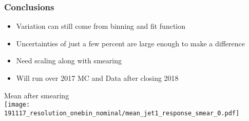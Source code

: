 \documentclass{beamer}
\newcommand{\beginbackup}{
  \newcounter{framenumbervorappendix}
  \setcounter{framenumbervorappendix}{\value{framenumber}}
}
\newcommand{\backupend}{
  \addtocounter{framenumbervorappendix}{-\value{framenumber}}
  \addtocounter{framenumber}{\value{framenumbervorappendix}}
}
\begin{document}
\begin{frame}
  \frametitle{Conclusions}

  \begin{itemize}
  \item Variation can still come from binning and fit function
  \item Uncertainties of just a few percent are large enough to make a difference
  \item Need scaling along with smearing
  \item Will run over 2017 MC and Data after closing 2018
  \end{itemize}

  \vfill

  \centering
  Mean after smearing \\
  \texttt{[image: 191117\_resolution\_onebin\_nominal/mean\_jet1\_response\_smear\_0.pdf]}

\end{frame}

\begin{comment}
\beginbackup

\begin{frame}
  \centering
    {\Huge \bf\sffamily Backup Slides}
\end{frame}



\backupend
\end{comment}
\end{document}
